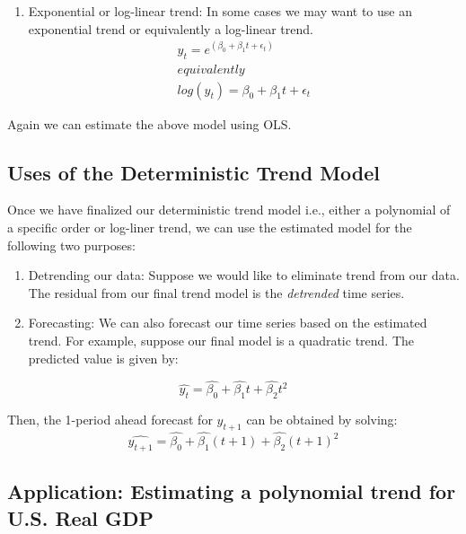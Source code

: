 \documentclass[]{book}
\providecommand{\tightlist}{%
  \setlength{\itemsep}{0pt}\setlength{\parskip}{0pt}}
\theoremstyle{definition}
\theoremstyle{definition}
\theoremstyle{definition}
\theoremstyle{remark}
\begin{document}
\begin{enumerate}
\def\labelenumi{\arabic{enumi}.}
\setcounter{enumi}{1}
\tightlist
\item
  Exponential or log-linear trend: In some cases we may want to use an
  exponential trend or equivalently a log-linear trend. \begin{align}
  y_t=e^{(\beta_0 +\beta_1 t +\epsilon_t)}\\
  equivalently\\
  log(y_t)=\beta_0 +\beta_1 t +\epsilon_t
  \end{align}
\end{enumerate}

Again we can estimate the above model using OLS.

\hypertarget{uses-of-the-deterministic-trend-model}{%
\subsection{Uses of the Deterministic Trend
Model}\label{uses-of-the-deterministic-trend-model}}

Once we have finalized our deterministic trend model i.e., either a
polynomial of a specific order or log-liner trend, we can use the
estimated model for the following two purposes:

\begin{enumerate}
\def\labelenumi{\arabic{enumi}.}
\item
  Detrending our data: Suppose we would like to eliminate trend from our
  data. The residual from our final trend model is the \emph{detrended}
  time series.
\item
  Forecasting: We can also forecast our time series based on the
  estimated trend. For example, suppose our final model is a quadratic
  trend. The predicted value is given by:
\end{enumerate}

\begin{equation}
\widehat{y_t}=\widehat{\beta_0}+\widehat{\beta_1} t + \widehat{\beta_2} t^2
\end{equation}

Then, the 1-period ahead forecast for \(y_{t+1}\) can be obtained by
solving: \begin{equation}
\widehat{y_{t+1}}=\widehat{\beta_0}+\widehat{\beta_1} (t+1) + \widehat{\beta_2} (t+1)^2
\end{equation}

\hypertarget{application-estimating-a-polynomial-trend-for-u.s.-real-gdp}{%
\subsection{Application: Estimating a polynomial trend for U.S. Real
GDP}\label{application-estimating-a-polynomial-trend-for-u.s.-real-gdp}}
\end{document}
